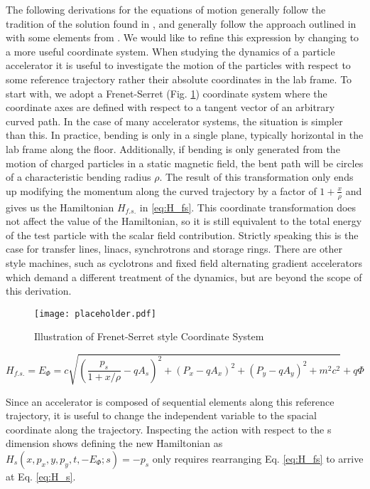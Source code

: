 The following derivations for the equations of motion generally follow the tradition of the solution found in \cite{CourantSnyder}, and generally follow the approach outlined in \cite{Wolski} with some elements from \cite{Lee}. We would like to refine this expression by changing to a more useful coordinate system. When studying the dynamics of a particle accelerator it is useful to investigate the motion of the particles with respect to some reference trajectory rather their absolute coordinates in the lab frame. To start with, we adopt a Frenet-Serret (Fig. \ref{fig:frenetSerret}) coordinate system where the coordinate axes are defined with respect to a tangent vector of an arbitrary curved path.  In the case of many accelerator systems, the situation is simpler than this. In practice, bending is only in a single plane, typically horizontal in the lab frame along the floor. Additionally, if bending is only generated from the motion of charged particles in a static magnetic field, the bent path will be circles of a characteristic bending radius $\rho$. The result of this transformation only ends up modifying the momentum along the curved trajectory by a factor of $1 + \frac{x}{\rho}$ and gives us the Hamiltonian $H_{f.s.}$ in \ref{eq:H_fs}. This coordinate transformation does not affect the value of the Hamiltonian, so it is still equivalent to the total energy of the test particle with the scalar field contribution. Strictly speaking this is the case for transfer lines, linacs, synchrotrons and storage rings. There are other style machines, such as cyclotrons and fixed field alternating gradient accelerators which demand a different treatment of the dynamics, but are beyond the scope of this derivation.

\begin{figure} \label{fig:frenetSerret}
	\centering
	\texttt{[image: placeholder.pdf]}
	\caption{Illustration of Frenet-Serret style Coordinate System}
\end{figure}

\begin{equation} \label{eq:H_fs}
	H_{f.s.} = E_{\Phi} = c\sqrt{\left(\frac{p_s}{1 + x/\rho} - qA_s\right)^2 + (P_x - qA_x)^2 + (P_y- qA_y)^2+ m^2c^2} + q\Phi
\end{equation}

Since an accelerator is composed of sequential elements along this reference trajectory, it is useful to change the independent variable to the spacial coordinate along the trajectory. Inspecting the action with respect to the s dimension shows defining the new Hamiltonian as $H_s(x,p_x,y,p_y,t,-E_{\Phi};s) = -p_s$ only requires rearranging Eq. \ref{eq:H_fs} to arrive at Eq. \ref{eq:H_s}.

